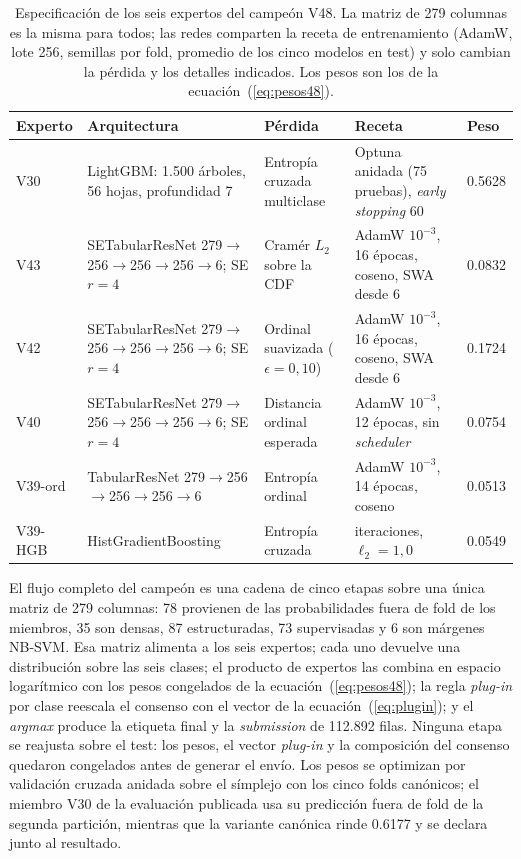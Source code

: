 \documentclass[journal]{IEEEtai}
\begin{document}
\begin{table}[htbp]
\centering
\caption{Especificaci\'on de los seis expertos del campe\'on V48. La matriz de 279 columnas es la misma para todos; las redes comparten la receta de entrenamiento (AdamW, lote 256, semillas por fold, promedio de los cinco modelos en test) y solo cambian la p\'erdida y los detalles indicados. Los pesos son los de la ecuaci\'on~(\ref{eq:pesos48}).}
\label{tab:expertos}
\footnotesize
\setlength{\tabcolsep}{4.5pt}
\begin{tabular}{p{}>{\raggedright\arraybackslash}p{}p{}>{\raggedright\arraybackslash}p{}p{}}
\toprule
Experto & Arquitectura & P\'erdida & Receta & Peso \\
\midrule
V30 & LightGBM: 1.500 \'arboles, 56 hojas, profundidad 7 & Entrop\'ia cruzada multiclase & Optuna anidada (75 pruebas), \textit{early stopping} 60 & 0.5628 \\
V43 & SETabularResNet 279$\to$256$\to$256$\to$256$\to$6; SE $r=4$ & Cram\'er $L_2$ sobre la CDF & AdamW $10^{-3}$, 16 \'epocas, coseno, SWA desde 6 & 0.0832 \\
V42 & SETabularResNet 279$\to$256$\to$256$\to$256$\to$6; SE $r=4$ & Ordinal suavizada ($\epsilon=0{,}10$) & AdamW $10^{-3}$, 16 \'epocas, coseno, SWA desde 6 & 0.1724 \\
V40 & SETabularResNet 279$\to$256$\to$256$\to$256$\to$6; SE $r=4$ & Distancia ordinal esperada & AdamW $10^{-3}$, 12 \'epocas, sin \textit{scheduler} & 0.0754 \\
V39-ord & TabularResNet 279$\to$256$\to$256$\to$256$\to$6 & Entrop\'ia ordinal & AdamW $10^{-3}$, 14 \'epocas, coseno & 0.0513 \\
V39-HGB & HistGradientBoosting & Entrop\'ia cruzada & 300 iteraciones, $\ell_2=1{,}0$ & 0.0549 \\
\bottomrule
\end{tabular}
\end{table}

El flujo completo del campe\'on es una cadena de cinco etapas sobre una \'unica matriz de 279
columnas: 78 provienen de las probabilidades fuera de fold de los miembros, 35 son densas, 87
estructuradas, 73 supervisadas y 6 son m\'argenes NB-SVM. Esa matriz alimenta a los seis expertos;
cada uno devuelve una distribuci\'on sobre las seis clases; el producto de expertos las combina en
espacio logar\'itmico con los pesos congelados de la ecuaci\'on~(\ref{eq:pesos48}); la regla
\textit{plug-in} por clase reescala el consenso con el vector de la ecuaci\'on~(\ref{eq:plugin}); y
el \textit{argmax} produce la etiqueta final y la \textit{submission} de 112.892 filas. Ninguna
etapa se reajusta sobre el test: los pesos, el vector \textit{plug-in} y la composici\'on del
consenso quedaron congelados antes de generar el env\'io. Los pesos se optimizan por validaci\'on
cruzada anidada sobre el s\'implejo con los cinco folds can\'onicos; el miembro V30 de la
evaluaci\'on publicada usa su predicci\'on fuera de fold de la segunda partici\'on, mientras que la
variante can\'onica rinde 0.6177 y se declara junto al resultado.
\end{document}
